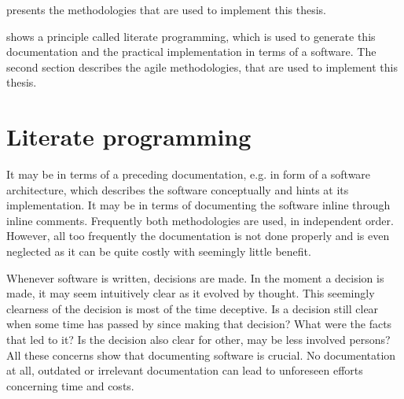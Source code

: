 \documentclass[%
    a4paper,    %
    justified,  %
    nobib,      %
    openany     %
]{tufte-book}
\begin{document}
 presents the methodologies that are used to implement
this thesis.

 shows a principle called literate
programming, which is used to generate this documentation and the practical
implementation in terms of a software. The second section describes the agile
methodologies, that are used to implement this thesis.

\section{Literate programming}
\label{sec:literate-programming}

 It may be in terms of
a preceding documentation, e.g. in form of a software architecture, which
describes the software conceptually and hints at its implementation. It may be
in terms of documenting the software inline through inline comments. Frequently
both methodologies are used, in independent order. However, all too frequently
the documentation is not done properly and is even neglected as it can be quite
costly with seemingly little benefit.

 Whenever software is written,
decisions are made. In the moment a decision is made, it may seem intuitively
clear as it evolved by thought. This seemingly clearness of the decision is most
of the time deceptive. Is a decision still clear when some time has passed by
since making that decision? What were the facts that led to it? Is the decision
also clear for other, may be less involved persons? All these concerns show that
documenting software is crucial. No documentation at all, outdated or irrelevant
documentation can lead to unforeseen efforts concerning time and costs.
\end{document}
